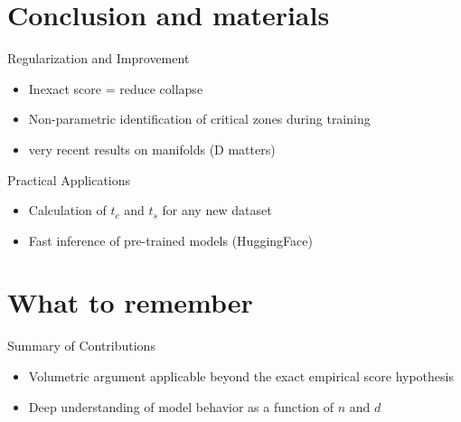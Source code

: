 \documentclass[aspectratio=169]{beamer}
\begin{document}
\section{Conclusion and materials}
\begin{frame}{Regularization and Improvement}
    \begin{itemize}
        \item Inexact score  = reduce collapse
        \item Non-parametric identification of critical zones during training
        \item very recent results on manifolds (D matters)
    \end{itemize}
\end{frame}



\begin{frame}{Practical Applications}
    \begin{itemize}
        \item Calculation of $t_c$ and $t_s$ for any new dataset
        \item Fast inference of pre-trained models (HuggingFace)
    \end{itemize}
\end{frame}

\section{What to remember}
\begin{frame}{Summary of Contributions}
    \begin{itemize}
        \item Volumetric argument applicable beyond the exact empirical score hypothesis
        \item Deep understanding of model behavior as a function of $n$ and $d$
    \end{itemize}
\end{frame}
\end{document}

